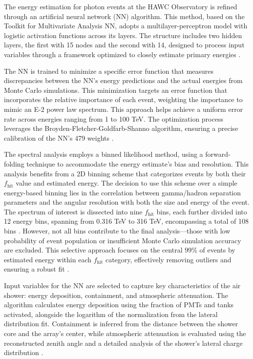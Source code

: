 The energy estimation for photon events at the HAWC Observatory is refined through an artificial neural network (NN) algorithm.
This method, based on the Toolkit for Multivariate Analysis NN, adopts a multilayer-perceptron model with logistic activation functions across its layers.
The structure includes two hidden layers, the first with 15 nodes and the second with 14, designed to process input variables through a framework optimized to closely estimate primary energies \cite{thesis_SamM}.

The NN is trained to minimize a specific error function that measures discrepancies between the NN's energy predictions and the actual energies from Monte Carlo simulations.
This minimization targets an error function that incorporates the relative importance of each event, weighting the importance to mimic an E-2 power law spectrum.
This approach helps achieve a uniform error rate across energies ranging from 1 to 100 TeV.
The optimization process leverages the Broyden-Fletcher-Goldfarb-Shanno algorithm, ensuring a precise calibration of the NN's 479 weights \cite{100TEV_Crab_HAWC}.

The spectral analysis employs a binned likelihood method, using a forward-folding technique to accommodate the energy estimate's bias and resolution.
This analysis benefits from a 2D binning scheme that categorizes events by both their $f_{\text{hit}}$ value and estimated energy.
The decision to use this scheme over a simple energy-based binning lies in the correlation between gamma/hadron separation parameters and the angular resolution with both the size and energy of the event.
The spectrum of interest is dissected into nine $f_{\text{hit}}$ bins, each further divided into 12 energy bins, spanning from 0.316 TeV to 316 TeV, encompassing a total of 108 bins \cite{100TEV_Crab_HAWC}.
However, not all bins contribute to the final analysis—those with low probability of event population or insufficient Monte Carlo simulation accuracy are excluded.
This selective approach focuses on the central 99\% of events by estimated energy within each $f_{\text{hit}}$ category, effectively removing outliers and ensuring a robust fit \cite{100TEV_Crab_HAWC}.

Input variables for the NN are selected to capture key characteristics of the air shower: energy deposition, containment, and atmospheric attenuation.
The algorithm calculates energy deposition using the fraction of PMTs and tanks activated, alongside the logarithm of the normalization from the lateral distribution fit.
Containment is inferred from the distance between the shower core and the array's center, while atmospheric attenuation is evaluated using the reconstructed zenith angle and a detailed analysis of the shower's lateral charge distribution \cite{thesis_SamM,100TEV_Crab_HAWC}.

